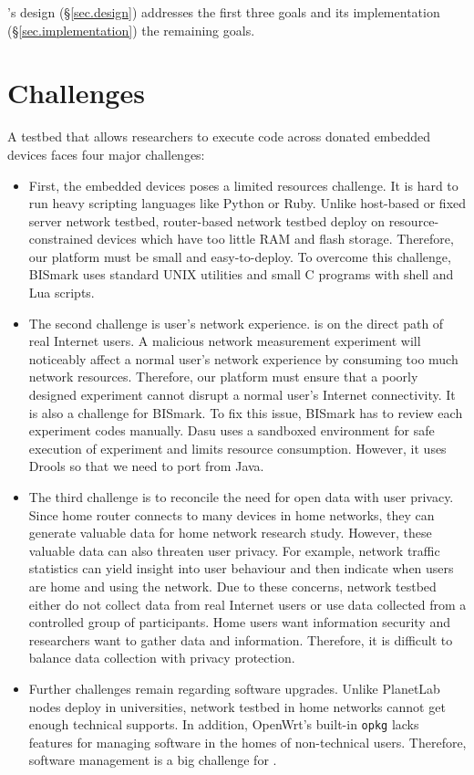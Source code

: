 \sysname's design (\S\ref{sec.design}) addresses the first three goals and its implementation (\S\ref{sec.implementation}) the remaining goals.

\section{Challenges}
\label{ssec.challenges}
A testbed that allows researchers to execute code across donated embedded devices faces four major challenges: 
\begin{itemize}
\item First, the embedded devices poses a limited resources challenge. It is hard to run heavy scripting languages like Python or Ruby. Unlike host-based or fixed server network testbed, router-based network testbed deploy on resource-constrained devices which have too little RAM and flash storage. Therefore, our platform must be small and easy-to-deploy. To overcome this challenge, BISmark uses standard UNIX utilities and small C programs with shell and Lua scripts.  
\item The second challenge is user's network experience. \sysname is on the direct path of real Internet users. A malicious network measurement experiment will noticeably affect a normal user's network experience by consuming too much network resources. Therefore, our platform must ensure that a poorly designed experiment cannot disrupt a normal user's Internet connectivity. It is also a challenge for BISmark. To fix this issue, BISmark has to review each experiment codes manually. Dasu uses a sandboxed environment for safe execution of experiment and limits resource consumption. However, it uses Drools so that we need to port from Java.
\item The third challenge is to reconcile the need for open data with user privacy. Since home router connects to many devices in home networks, they can generate valuable data for home network research study. However, these valuable data can also threaten user privacy. For example, network traffic statistics can yield insight into user behaviour and then indicate when users are home and using the network. Due to these concerns, network testbed either do not collect data from real Internet users or use data collected from a controlled group of participants. Home users want information security and researchers want to gather data and information. Therefore, it is difficult to balance data collection with privacy protection.
\item Further challenges remain regarding software upgrades. Unlike PlanetLab nodes deploy in universities, network testbed in home networks cannot get enough technical supports. In addition, OpenWrt's built-in \texttt{opkg} lacks features for managing software in the homes of non-technical users. Therefore, software management is a big challenge for \sysname.  
\end{itemize}
